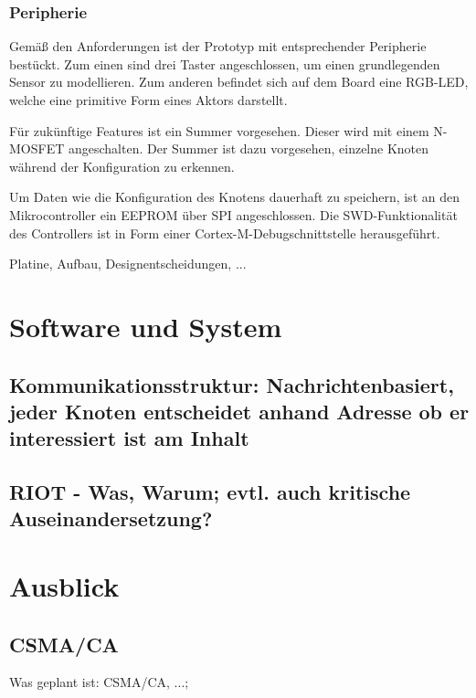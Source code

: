 \documentclass{IEEEtran}
\begin{document}
\subsubsection{Peripherie}
Gemäß den Anforderungen ist der Prototyp mit entsprechender Peripherie bestückt.
Zum einen sind drei Taster angeschlossen, um einen grundlegenden Sensor zu modellieren.
Zum anderen befindet sich auf dem Board eine RGB-LED, welche eine primitive Form eines Aktors darstellt.

Für zukünftige Features ist ein Summer vorgesehen.
Dieser wird mit einem N-MOSFET angeschalten.
Der Summer ist dazu vorgesehen, einzelne Knoten während der Konfiguration zu erkennen.

Um Daten wie die Konfiguration des Knotens dauerhaft zu speichern, ist an den Mikrocontroller ein EEPROM über SPI angeschlossen.
Die SWD-Funktionalität des Controllers ist in Form einer Cortex-M-Debugschnittstelle herausgeführt.




    Platine, Aufbau, Designentscheidungen, ...


\section{Software und System}
    \subsection{Kommunikationsstruktur: Nachrichtenbasiert, jeder Knoten entscheidet anhand Adresse ob er interessiert ist am Inhalt}
    \subsection{RIOT - Was, Warum; evtl. auch kritische Auseinandersetzung?}


\section{Ausblick}

    \subsection{CSMA/CA}
Was geplant ist: CSMA/CA, ...;
\end{document}
